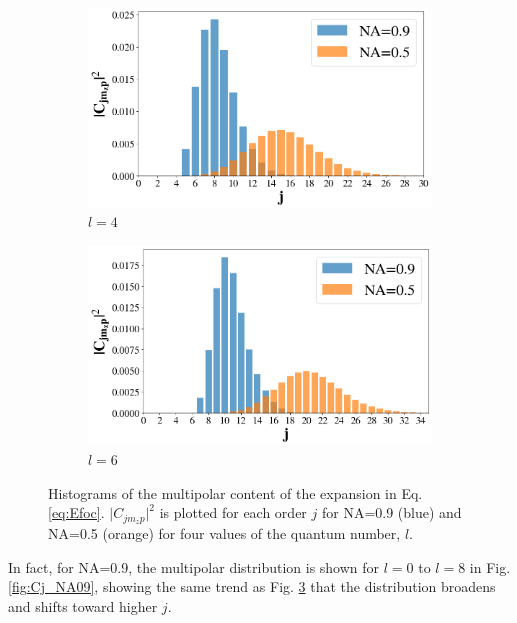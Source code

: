 \begin{figure}
    \par

    \begin{subfigure}[b]{0.49\textwidth}
        \includegraphics[width=\textwidth]{Figures/contentl4.png}
        \caption{\( l=4 \)}
        \label{fig:cc}
    \end{subfigure}
    \begin{subfigure}[b]{0.49\textwidth}
        \includegraphics[width=\textwidth]{Figures/contentl6.png}
        \caption{\( l=6 \)}
        \label{fig:dd}
    \end{subfigure}

    \caption{Histograms of the multipolar content of the expansion in Eq. \ref{eq:Efoc}. \( \lvert C_{jm_z p} \rvert^2 \) is plotted for each order \( j \) for NA=0.9 (blue) and NA=0.5 (orange) for four values of the quantum number, \( l \).}
    \label{fig:mcontent}
\end{figure}

In fact, for NA=0.9, the multipolar distribution is shown for \( l=0 \) to \( l=8 \) in Fig. \ref{fig:Cj_NA09}, showing the same trend as Fig. \ref{fig:mcontent} that the distribution broadens and shifts toward higher \( j \).

